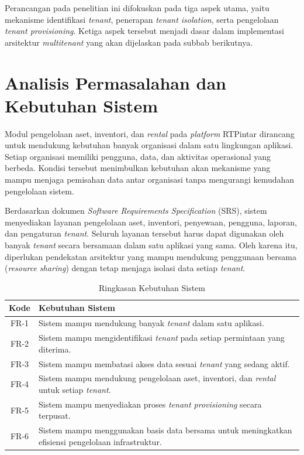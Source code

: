 Perancangan pada penelitian ini difokuskan pada tiga aspek utama, yaitu mekanisme identifikasi \textit{tenant}, penerapan \textit{tenant isolation}, serta pengelolaan \textit{tenant provisioning}. Ketiga aspek tersebut menjadi dasar dalam implementasi arsitektur \textit{multitenant} yang akan dijelaskan pada subbab berikutnya.

\section{Analisis Permasalahan dan Kebutuhan Sistem}

Modul pengelolaan aset, inventori, dan \textit{rental} pada \textit{platform} RTPintar dirancang untuk mendukung kebutuhan banyak organisasi dalam satu lingkungan aplikasi. Setiap organisasi memiliki pengguna, data, dan aktivitas operasional yang berbeda. Kondisi tersebut menimbulkan kebutuhan akan mekanisme yang mampu menjaga pemisahan data antar organisasi tanpa mengurangi kemudahan pengelolaan sistem.

Berdasarkan dokumen \textit{Software Requirements Specification} (SRS), sistem menyediakan layanan pengelolaan aset, inventori, penyewaan, pengguna, laporan, dan pengaturan \textit{tenant}. Seluruh layanan tersebut harus dapat digunakan oleh banyak \textit{tenant} secara bersamaan dalam satu aplikasi yang sama. Oleh karena itu, diperlukan pendekatan arsitektur yang mampu mendukung penggunaan bersama (\textit{resource sharing}) dengan tetap menjaga isolasi data setiap \textit{tenant}.

\begin{table}[H]
  \centering
  \caption{Ringkasan Kebutuhan Sistem}
  \label{tab:kebutuhan_sistem}
  \begin{tabular}{|c|p{11cm}|}
    \hline
    \rowcolor[HTML]{EFEFEF}
    \textbf{Kode} & \textbf{Kebutuhan Sistem} \\
    \hline
    FR-1 & Sistem mampu mendukung banyak \textit{tenant} dalam satu aplikasi. \\
    \hline
    FR-2 & Sistem mampu mengidentifikasi \textit{tenant} pada setiap permintaan yang diterima. \\
    \hline
    FR-3 & Sistem mampu membatasi akses data sesuai \textit{tenant} yang sedang aktif. \\
    \hline
    FR-4 & Sistem mampu mendukung pengelolaan aset, inventori, dan \textit{rental} untuk setiap \textit{tenant}. \\
    \hline
    FR-5 & Sistem mampu menyediakan proses \textit{tenant provisioning} secara terpusat. \\
    \hline
    FR-6 & Sistem mampu menggunakan basis data bersama untuk meningkatkan efisiensi pengelolaan infrastruktur. \\
    \hline
  \end{tabular}
\end{table}

